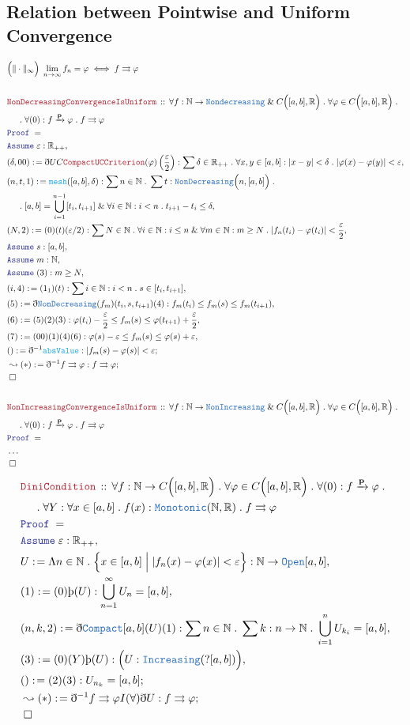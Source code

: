 \documentclass[12pt]{scrartcl}
\newcommand{\TYPE}[1]{\textcolor{NavyBlue}{\mathtt{#1}}}
\newcommand{\FUNC}[1]{\textcolor{Cerulean}{\mathtt{#1}}}
\newcommand{\LOGIC}[1]{\textcolor{Blue}{\mathtt{#1}}}
\newcommand{\THM}[1]{\textcolor{Maroon}{\mathtt{#1}}}
\renewcommand{\.}{\; . \;}
\newcommand{\de}{: \kern 0.1pc =}
\newcommand{\Theorem}[2]{& \THM{#1} \, :: \, #2 \\ & \Proof = \\ }
\newcommand{\NewLine}{\\ & \kern 1pc}
\newcommand{\Page}[1]{ \begin{align*} #1 \end{align*}   }
\newcommand{ \bd }{ \ByDef }
\newcommand{\NoProof}{ & \ldots \\ \EndProof}
\renewcommand{\And}{\; \& \;}
\newcommand{\Reals}{\mathbb{R} }
\newcommand{\Nat}{\mathbb{N} }
\newcommand{\Say}[3]{& #1 \de #2 : #3, \\}
\newcommand{\Conclude}[3]{& #1 \de #2 : #3; \\}
\newcommand{\DeriveConclude}[3]{& \leadsto #1 \de #2 : #3 ; \\}
\newcommand{\Assume}[2]{& \LOGIC{Assume} \;#1 : #2, \\}
\newcommand{\QED}{\; \square}
\newcommand{\EndProof}{& \QED \\}
\newcommand{\ByDef}{\eth}
\newcommand{\ByConstr}{\text{\thorn}}
\newcommand{\Proof}{\LOGIC{Proof} \; }
\newcommand{\ToU}{\rightrightarrows}
\begin{document}
\subsection{Relation between Pointwise and Uniform Convergence}
\Page{
	& \Big( \|\cdot\|_\infty \Big) \; \lim_{n \to \infty}  f_n =   \varphi 
		\iff f \ToU \varphi \\
    \\
    \Theorem{NonDecreasingConvergenceIsUniform}{ \forall f : \Nat \to \TYPE{Nondecreasing} \And C\Big( [a,b] ,\Reals\Big) 
    	\. \forall \varphi \in C\Big( [a,b], \Reals \Big) \. \NewLine \.
	\forall (0) : f \xrightarrow{\mathbf{p}} \varphi \. f \ToU \varphi
    }
    \Assume{\varepsilon}{\Reals_{++}}
    \Say{(\delta,00)}{ \bd UC \THM{CompactUCCriterion}(\varphi)\left( \frac{\varepsilon}{2} \right)   }
    { \sum \delta \in \Reals_{++} \. \forall x,y \in [a,b] : |x - y| < \delta \. |\varphi(x) - \varphi(y)| < \varepsilon }
    \Say{(n,t,1)}{\FUNC{mesh}([a,b],\delta)}{
	    \sum n \in \Nat \. \sum t : \TYPE{NonDecreasing}\Big( n,  [a,b]\Big) \. 
	    \NewLine \.
	    [a,b] = \bigcup^{n-1}_{i = 1}  [t_i,t_{i + 1}] \And
	    \forall i \in \Nat : i < n \.   t_{i+1} - t_{i} \le \delta
    }
    \Say{(N,2)}{ (0)(t)(\varepsilon/2) }
    {\sum N \in \Nat \. \forall i \in \Nat : i \le n \And \forall m \in \Nat : m \ge N \.  
      | f_n(t_i) - \varphi(t_i) | < \frac{\varepsilon}{2} 
    }
    \Assume{s}{[a,b]}
    \Assume{m}{\Nat}
    \Assume{(3)}{ m \ge N }
    \Say{(i,4)}{(1_1)(t)}{ \sum i \in \Nat : i < n \.  s \in [t_i,t_{i+1}] }
    \Say{(5)}{\bd \TYPE{NonDecreasing}(f_m)(t_i,s,t_{i+1})(4)}{f_m(t_i) \le f_m(s) \le f_m(t_{i+1})}
    \Say{(6)}{(5)(2)(3)}{  \varphi(t_i) - \frac{\varepsilon}{2} \le f_m(s) \le \varphi(t_{t+1}) + \frac{\varepsilon}{2}   }
    \Say{(7)}{(00)(1)(4)(6)}{ \varphi(s) - \varepsilon \le f_m(s) \le \varphi(s) + \varepsilon }
    \Conclude{()}{\bd^{-1}\FUNC{absValue}}{| f_m(s) - \varphi(s)  | < \varepsilon}
    \DeriveConclude{(*)}{\bd^{-1} f \ToU \varphi}{f \ToU \varphi}
    \EndProof
    \\
    \Theorem{NonIncreasingConvergenceIsUniform}{ \forall f : \Nat \to \TYPE{NonIncreasing} \And C\Big( [a,b] ,\Reals\Big) 
    	\. \forall \varphi \in C\Big( [a,b], \Reals \Big) \. \NewLine \.
	\forall (0) : f \xrightarrow{\mathbf{p}} \varphi \. f \ToU \varphi
    }
    \NoProof
}
\newpage
\Page{
	\Theorem{DiniCondition}{ \forall f : \Nat \to C\Big([a,b],\Reals\Big) \. \forall \varphi \in C\Big([a,b],\Reals\Big) 
		\.  \forall (0) : f \xrightarrow{\mathbf{p}} \varphi \. 
		\NewLine \.  \forall Y : \forall x \in [a,b] \. 
		 f(x) : \TYPE{Monotonic}(\Nat,\Reals) \. f \ToU \varphi
	}
	\Assume{\varepsilon}{\Reals_{++}}
	\Say{U}{\Lambda n \in \Nat \. \Big\{ x \in [a,b] \; \Big| \; |f_n(x) - \varphi(x)| < \varepsilon  \Big\} }
	{\Nat \to \TYPE{Open}[a,b]}
	\Say{(1)}{(0)\ByConstr(U)}{ \bigcup^\infty_{n=1} U_n = [a,b]  }
	\Say{(n,k,2)}{\bd \TYPE{Compact}[a,b](U)(1)}{\sum n \in \Nat \. \sum k : n \to \Nat \. \bigcup^n_{i=1} U_{k_i} = [a,b]}
	\Say{(3)}{(0)(Y)\ByConstr(U)}{\Big( U : \TYPE{Increasing}(?[a,b]) \Big)}
	\Conclude{()}{(2)(3)}{U_{n_k} = [a,b]}
	\DeriveConclude{(*)}{ \bd^{-1} f \ToU \varphi I(\forall) \bd U}{f \ToU \varphi}
	\EndProof
}
\newpage
\end{document}
